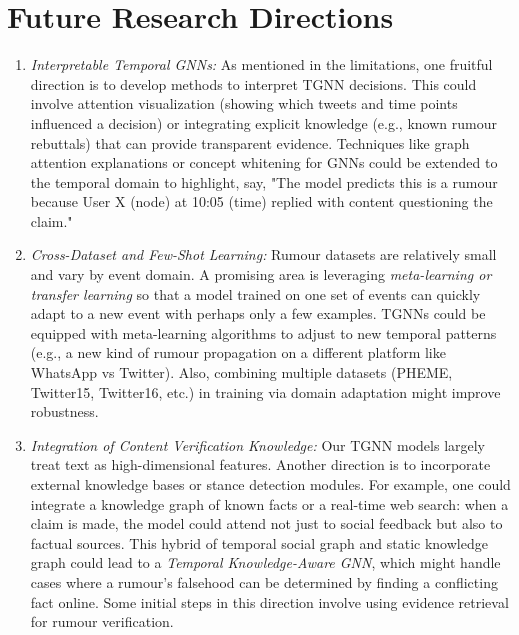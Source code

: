 \documentclass{cshonours}
\begin{document}
\section{Future Research Directions}

\begin{enumerate}
\item \emph{Interpretable Temporal GNNs:} As mentioned in the limitations, one fruitful direction is to develop methods to interpret TGNN decisions. This could involve attention visualization (showing which tweets and time points influenced a decision) or integrating explicit knowledge (e.g., known rumour rebuttals) that can provide transparent evidence. Techniques like graph attention explanations or concept whitening for GNNs could be extended to the temporal domain to highlight, say, "The model predicts this is a rumour because User X (node) at 10:05 (time) replied with content questioning the claim."~\cite{kim2022interpretable,rahman2024primer}

\item \emph{Cross-Dataset and Few-Shot Learning:} Rumour datasets are relatively small and vary by event domain. A promising area is leveraging \emph{meta-learning or transfer learning} so that a model trained on one set of events can quickly adapt to a new event with perhaps only a few examples. TGNNs could be equipped with meta-learning algorithms to adjust to new temporal patterns (e.g., a new kind of rumour propagation on a different platform like WhatsApp vs Twitter). Also, combining multiple datasets (PHEME, Twitter15, Twitter16, etc.) in training via domain adaptation might improve robustness.~\cite{Wang2025Challenging,zhang2024temporal}

\item \emph{Integration of Content Verification Knowledge:} Our TGNN models largely treat text as high-dimensional features. Another direction is to incorporate external knowledge bases or stance detection modules. For example, one could integrate a knowledge graph of known facts or a real-time web search: when a claim is made, the model could attend not just to social feedback but also to factual sources. This hybrid of temporal social graph and static knowledge graph could lead to a \emph{Temporal Knowledge-Aware GNN}, which might handle cases where a rumour's falsehood can be determined by finding a conflicting fact online. Some initial steps in this direction involve using evidence retrieval for rumour verification.~\cite{Song2021FakeNews}


\end{enumerate}
\end{document}
